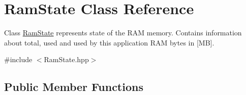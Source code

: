 \hypertarget{classRamState}{}\section{Ram\+State Class Reference}
\label{classRamState}


Class \hyperlink{classRamState}{Ram\+State} represents state of the R\+AM memory. Contains information about total, used and used by this application R\+AM bytes in \mbox{[}MB\mbox{]}.  




{\ttfamily \#include $<$Ram\+State.\+hpp$>$}

\subsection*{Public Member Functions}
